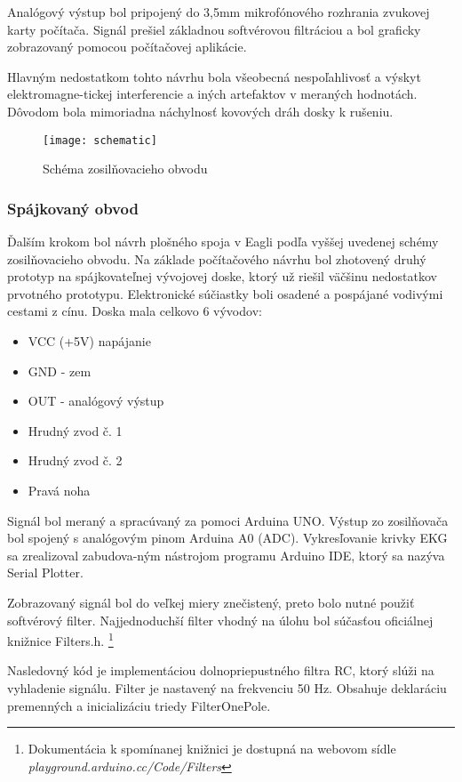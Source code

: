 \documentclass[titlepage,12pt]{article}
\begin{document}
Analógový výstup bol pripojený do 3,5mm mikrofónového rozhrania zvukovej karty počítača. Signál prešiel základnou softvérovou filtráciou a bol graficky zobrazovaný pomocou počítačovej aplikácie.

Hlavným nedostatkom tohto návrhu bola všeobecná nespoľahlivosť a výskyt elektromagne-tickej interferencie a iných artefaktov v meraných hodnotách. Dôvodom bola mimoriadna náchylnosť kovových dráh dosky k rušeniu.


\begin{figure}[!ht]
\begin{center}
\texttt{[image: schematic]}
\caption{Schéma zosilňovacieho obvodu}
\end{center}
\end{figure}

\newpage
\subsubsection{Spájkovaný obvod}
Ďalším krokom bol návrh plošného spoja v Eagli podľa vyššej uvedenej schémy zosilňovacieho obvodu. Na základe počítačového návrhu bol zhotovený druhý prototyp na spájkovateľnej vývojovej doske, ktorý už riešil väčšinu nedostatkov prvotného prototypu. Elektronické súčiastky boli osadené a pospájané vodivými cestami z cínu. Doska mala celkovo 6 vývodov:
\begin{itemize}
	\item VCC (+5V) napájanie
	\item GND - zem
	\item OUT - analógový výstup
	\item Hrudný zvod č. 1
	\item Hrudný zvod č. 2
	\item Pravá noha
\end{itemize}
Signál bol meraný a spracúvaný za pomoci Arduina UNO. Výstup zo zosilňovača bol spojený \linebreak s analógovým pinom Arduina A0 (ADC). Vykresľovanie krivky EKG sa zrealizoval zabudova-ným nástrojom programu Arduino IDE, ktorý sa nazýva Serial Plotter.

Zobrazovaný signál bol do veľkej miery znečistený, preto bolo nutné použiť softvérový filter. Najjednoduchší filter vhodný na úlohu bol súčasťou oficiálnej knižnice Filters.h. \footnote{Dokumentácia k spomínanej knižnici je dostupná na webovom sídle \textit{playground.arduino.cc/Code/Filters}}

Nasledovný kód je implementáciou dolnopriepustného filtra RC, ktorý slúži na vyhladenie signálu. Filter je nastavený na frekvenciu 50 Hz. Obsahuje deklaráciu premenných a inicializáciu triedy FilterOnePole.
\end{document}
